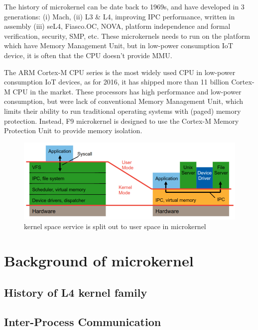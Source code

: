 \documentclass[10pt,preprint,nocopyrightspace]{sigplanconf}
\begin{document}
The history of microkernel can be date back to 1969s, and have developed in 3 generations: (i) Mach, (ii) L3 \& L4, improving IPC performance, written in assembly (iii) seL4, Fiasco.OC, NOVA, platform independence and formal verification, security, SMP, etc. These microkernels needs to run on the platform which have Memory Management Unit, but in low-power consumption IoT device, it is often that the CPU doesn't provide MMU.

The ARM Cortex-M CPU series is the most widely used CPU in low-power consumption IoT devices, as for 2016, it has shipped more than 11 billion Cortex-M CPU in the market. These processors has high performance and low-power consumption, but were lack of conventional Memory Management Unit, which limits their ability to run traditional operating systems with (paged) memory protection. Instead, F9 microkernel is designed to use the Cortex-M Memory Protection Unit to provide memory isolation.

\begin{figure}[H]
	\begin{center}
		\includegraphics[width=\linewidth]{picture/kernel_diff.png}
	\end{center}
	\caption{kernel space service is split out to user space in microkernel \cite{heiser2012}}
	\label{fig:kernel_diff}
\end{figure}


\section{Background of microkernel}

\subsection{History of L4 kernel family}


\subsection{Inter-Process Communication}
\end{document}
